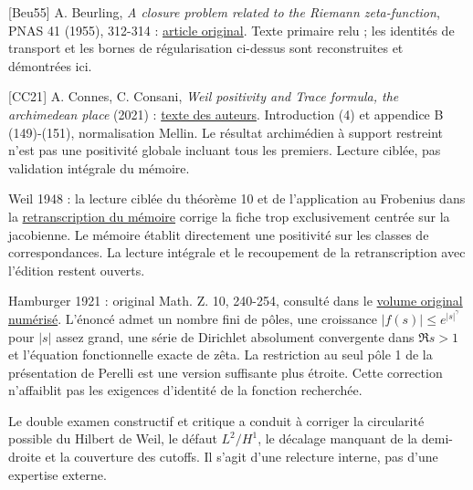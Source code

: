 \documentclass[
  10pt,
  a4paper,
]{article}
\begin{document}
{[}Beu55{]} A. Beurling, \emph{A closure problem related to the Riemann
zeta-function}, PNAS 41 (1955), 312-314 :
\href{https://www.pnas.org/doi/pdf/10.1073/pnas.41.5.312}{article
original}. Texte primaire relu ; les identités de transport et les
bornes de régularisation ci-dessus sont reconstruites et démontrées ici.

{[}CC21{]} A. Connes, C. Consani, \emph{Weil positivity and Trace
formula, the archimedean place} (2021) :
\href{https://alainconnes.org/wp-content/uploads/Selecta.pdf}{texte des
auteurs}. Introduction (4) et appendice B (149)-(151), normalisation
Mellin. Le résultat archimédien à support restreint n'est pas une
positivité globale incluant tous les premiers. Lecture ciblée, pas
validation intégrale du mémoire.

Weil 1948 : la lecture ciblée du théorème 10 et de l'application au
Frobenius dans la
\href{https://denisevellachemla.eu/Weil-courbes-varietes.pdf}{retranscription
du mémoire} corrige la fiche trop exclusivement centrée sur la
jacobienne. Le mémoire établit directement une positivité sur les
classes de correspondances. La lecture intégrale et le recoupement de la
retranscription avec l'édition restent ouverts.

Hamburger 1921 : original Math. Z. 10, 240-254, consulté dans le
\href{https://gdz.sub.uni-goettingen.de/download/pdf/PPN266833020_0010/PPN266833020_0010.pdf}{volume
original numérisé}. L'énoncé admet un nombre fini de pôles, une
croissance \(|f(s)|\le e^{|s|^\gamma}\) pour \(|s|\) assez grand, une
série de Dirichlet absolument convergente dans \(\Re s>1\) et l'équation
fonctionnelle exacte de zêta. La restriction au seul pôle 1 de la
présentation de Perelli est une version suffisante plus étroite. Cette
correction n'affaiblit pas les exigences d'identité de la fonction
recherchée.

Le double examen constructif et critique a conduit à corriger la
circularité possible du Hilbert de Weil, le défaut \(L^2/H^1\), le
décalage manquant de la demi-droite et la couverture des cutoffs. Il
s'agit d'une relecture interne, pas d'une expertise externe.
\end{document}
